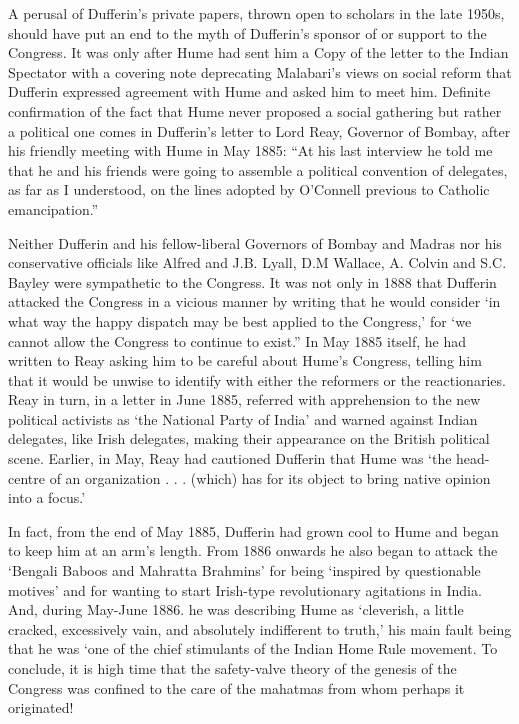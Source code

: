 A perusal of Dufferin’s private papers, thrown open to scholars in the late 1950s, should have put an end to the myth of Dufferin’s sponsor of or support to the Congress. It was only after Hume had sent him a Copy of the letter to the Indian Spectator with a covering note deprecating Malabari’s views on social reform that Dufferin expressed agreement with Hume and asked him to meet him. Definite confirmation of the fact that Hume never proposed a social gathering but rather a political one comes in Dufferin’s letter to Lord Reay, Governor of Bombay, after his friendly meeting with Hume in May 1885: “At his last interview he told me that he and his friends were going to assemble a political convention of delegates, as far as I understood, on the lines adopted by O’Connell previous to Catholic emancipation.”

Neither Dufferin and his fellow-liberal Governors of Bombay and Madras nor his conservative officials like Alfred and J.B. Lyall, D.M Wallace, A. Colvin and S.C. Bayley were sympathetic to the Congress. It was not only in 1888 that Dufferin attacked the Congress in a vicious manner by writing that he would consider ‘in what way the happy dispatch may be best applied to the Congress,’ for ‘we cannot allow the Congress to continue to exist.” In May 1885 itself, he had written to Reay asking him to be careful about Hume’s Congress, telling him that it would be unwise to identify with either the reformers or the reactionaries. Reay in turn, in a letter in June 1885, referred with apprehension to the new political activists as ‘the National Party of India’ and warned against Indian delegates, like Irish delegates, making their appearance on the British political scene. Earlier, in May, Reay had cautioned Dufferin that Hume was ‘the head-centre of an organization . . . (which) has for its object to bring native opinion into a focus.’

In fact, from the end of May 1885, Dufferin had grown cool to Hume and began to keep him at an arm’s length. From 1886 onwards he also began to attack the ‘Bengali Baboos and Mahratta Brahmins’ for being ‘inspired by questionable motives’ and for wanting to start Irish-type revolutionary agitations in India. And, during May-June 1886. he was describing Hume as ‘cleverish, a little cracked, excessively vain, and absolutely indifferent to truth,’ his main fault being that he was ‘one of the chief stimulants of the Indian Home Rule movement. To conclude, it is high time that the safety-valve theory of the genesis of the Congress was confined to the care of the mahatmas from whom perhaps it originated!

